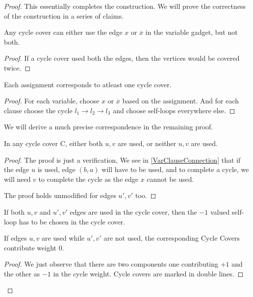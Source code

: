 \begin{proof}
This essentially completes the construction. We will prove the correctness of the construction in a series of claims.
\begin{claim}
Any cycle cover can either use the edge $x$ or $\overline{x}$ in the variable gadget, but not both.
\end{claim}
\begin{proof}
If a cycle cover used both the edges, then the vertices would be covered twice. 
\end{proof}

\begin{claim}
Each assignment corresponds to atleast one cycle cover. 
\end{claim}
\begin{proof}
For each variable, choose $x$ or $\overline{x}$ based on the assignment. And for each clause choose the cycle $l_1 \rightarrow l_2 \rightarrow l_3$ and choose self-loops everywhere else.
\end{proof}

We will derive a much precise correspondence in the remaining proof.


\begin{claim}
In any cycle cover C, either both $u,v$ are used, or neither $u,v$ are used.
\end{claim}
\begin{proof}
The proof is just a verification, We see in \ref{VarClauseConnection} that if the edge $u$ is used, edge $(b,a)$ will have to be used, and to complete a cycle, we will need $v$ to complete the cycle as the edge $x$ cannot be used. 

The proof holds unmodified for edges $u',v'$ too.
\end{proof}

\begin{claim}
If both $u,v$ and $u',v'$ edges are used in the cycle cover, then the $-1$ valued self-loop has to be chosen in the cycle cover. 
\end{claim}

\begin{claim}
If edges $u,v$ are used while $u',v'$ are not used, the corresponding Cycle Covers contribute weight 0.
\end{claim}
\begin{proof}
We just observe that there are two components one contributing $+1$ and the other as $-1$ in the cycle weight. Cycle covers are marked in double lines.


\end{proof}
\end{proof}
